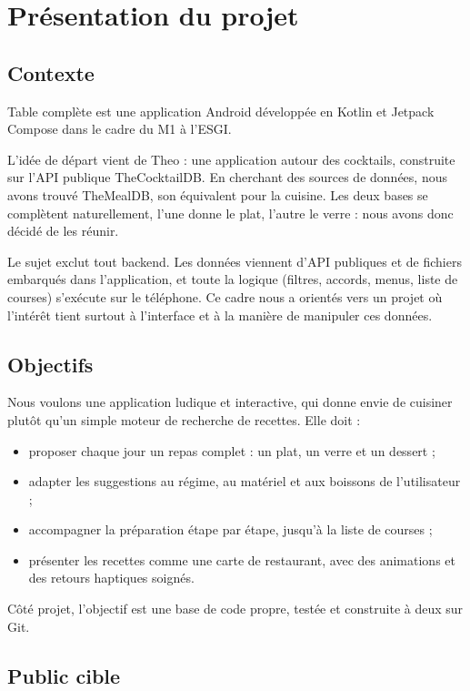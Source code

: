 \chapter{Présentation du projet}

\section{Contexte}

Table complète est une application Android développée en Kotlin et Jetpack
Compose dans le cadre du M1 à l'ESGI.

L'idée de départ vient de Theo : une application autour des cocktails,
construite sur l'API publique TheCocktailDB. En cherchant des sources de
données, nous avons trouvé TheMealDB, son équivalent pour la cuisine. Les deux
bases se complètent naturellement, l'une donne le plat, l'autre le verre :
nous avons donc décidé de les réunir.

Le sujet exclut tout backend. Les données viennent d'API publiques et de
fichiers embarqués dans l'application, et toute la logique (filtres, accords,
menus, liste de courses) s'exécute sur le téléphone. Ce cadre nous a orientés
vers un projet où l'intérêt tient surtout à l'interface et à la manière de
manipuler ces données.

\section{Objectifs}

Nous voulons une application ludique et interactive, qui donne envie de
cuisiner plutôt qu'un simple moteur de recherche de recettes. Elle doit :

\begin{itemize}
  \item proposer chaque jour un repas complet : un plat, un verre et un dessert ;
  \item adapter les suggestions au régime, au matériel et aux boissons de
        l'utilisateur ;
  \item accompagner la préparation étape par étape, jusqu'à la liste de courses ;
  \item présenter les recettes comme une carte de restaurant, avec des
        animations et des retours haptiques soignés.
\end{itemize}

Côté projet, l'objectif est une base de code propre, testée et construite à
deux sur Git.

\section{Public cible}

